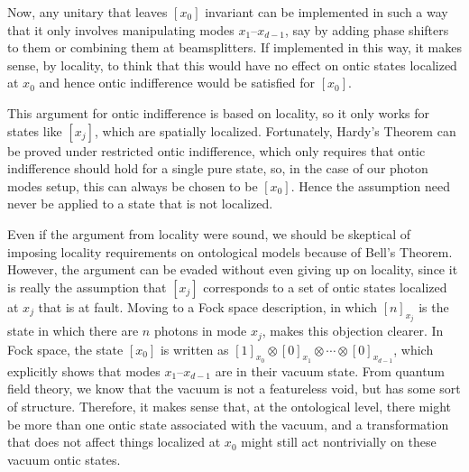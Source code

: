 \documentclass[DIV=calc,fontsize=12pt]{scrartcl} %
\theoremstyle{definition}
\theoremstyle{plain}
\newcommand{\Proj}[1]{\ensuremath{\left [ #1 \right ]}}
\begin{document}
Now, any unitary that leaves $\Proj{x_0}$ invariant can be implemented
in such a way that it only involves manipulating modes
$x_1$--$x_{d-1}$, say by adding phase shifters to them or combining
them at beamsplitters.  If implemented in this way, it makes sense, by
locality, to think that this would have no effect on ontic states
localized at $x_0$ and hence ontic indifference would be satisfied for
$\Proj{x_0}$.

This argument for ontic indifference is based on locality, so it only
works for states like $\Proj{x_j}$, which are spatially localized.
Fortunately, Hardy's Theorem can be proved under restricted ontic
indifference, which only requires that ontic indifference should hold
for a single pure state, so, in the case of our photon modes setup,
this can always be chosen to be $\Proj{x_0}$.  Hence the assumption
need never be applied to a state that is not localized.

Even if the argument from locality were sound, we should be skeptical
of imposing locality requirements on ontological models because of
Bell's Theorem.  However, the argument can be evaded without even
giving up on locality, since it is really the assumption that
$\Proj{x_j}$ corresponds to a set of ontic states localized at $x_j$
that is at fault.  Moving to a Fock space description, in which
$\Proj{n}_{x_j}$ is the state in which there are $n$ photons in mode
$x_j$, makes this objection clearer.  In Fock space, the state
$\Proj{x_0}$ is written as $\Proj{1}_{x_0} \otimes \Proj{0}_{x_1}
\otimes \cdots \otimes \Proj{0}_{x_{d-1}}$, which explicitly shows that
modes $x_1$--$x_{d-1}$ are in their vacuum state.  From quantum field
theory, we know that the vacuum is not a featureless void, but has
some sort of structure.  Therefore, it makes sense that, at the
ontological level, there might be more than one ontic state associated
with the vacuum, and a transformation that does not affect things
localized at $x_0$ might still act nontrivially on these vacuum ontic
states.
\end{document}
